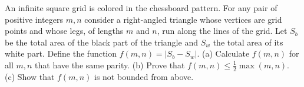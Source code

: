 An infinite square grid is colored in the chessboard pattern. For any pair of positive integers $m, n$ consider a right-angled triangle whose vertices are grid points and whose legs, of lengths $m$ and $n$, run along the lines of the grid. Let $S_b$ be the total area of the black part of the triangle and $S_w$ the total area of its white part. Define the function $f(m,n) = |S_b - S_w|$.
(a) Calculate $f(m,n)$ for all $m, n$ that have the same parity.
(b) Prove that $f(m,n) \leq \frac{1}{2} \max(m,n)$.
(c) Show that $f(m,n)$ is not bounded from above.
